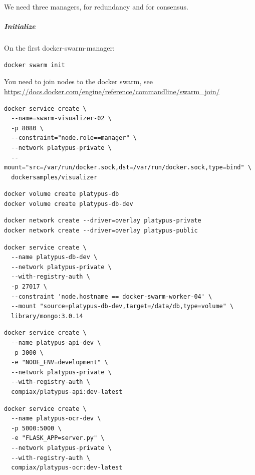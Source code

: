 \documentclass[12pt,a4paper]{article}
\begin{document}
We need three managers, for redundancy and for consensus.

\subparagraph{Initialize}
\subparagraph{}
On the first docker-swarm-manager:
\vspace{0.5cm}
\begin{lstlisting}
docker swarm init
\end{lstlisting}
 \vspace{0.5cm}
You need to join nodes to the docker swarm, see  \url{https://docs.docker.com/engine/reference/commandline/swarm_join/} 
\vspace{0.5cm}
\begin{lstlisting}
docker service create \
  --name=swarm-visualizer-02 \
  -p 8080 \
  --constraint="node.role==manager" \
  --network platypus-private \
  --mount="src=/var/run/docker.sock,dst=/var/run/docker.sock,type=bind" \
  dockersamples/visualizer
\end{lstlisting}
\vspace{0.5cm}
\begin{lstlisting}
docker volume create platypus-db
docker volume create platypus-db-dev
\end{lstlisting}
\vspace{0.5cm}
\begin{lstlisting}
docker network create --driver=overlay platypus-private
docker network create --driver=overlay platypus-public
\end{lstlisting}
\vspace{0.5cm}
\begin{lstlisting}
docker service create \
  --name platypus-db-dev \
  --network platypus-private \
  --with-registry-auth \
  -p 27017 \
  --constraint 'node.hostname == docker-swarm-worker-04' \
  --mount "source=platypus-db-dev,target=/data/db,type=volume" \
  library/mongo:3.0.14
\end{lstlisting}
\vspace{0.5cm}
\begin{lstlisting}
docker service create \
  --name platypus-api-dev \
  -p 3000 \
  -e "NODE_ENV=development" \
  --network platypus-private \
  --with-registry-auth \
  compiax/platypus-api:dev-latest
\end{lstlisting}
\vspace{0.5cm}
\begin{lstlisting}
docker service create \
  --name platypus-ocr-dev \
  -p 5000:5000 \
  -e "FLASK_APP=server.py" \
  --network platypus-private \
  --with-registry-auth \
  compiax/platypus-ocr:dev-latest
\end{lstlisting}
\end{document}
